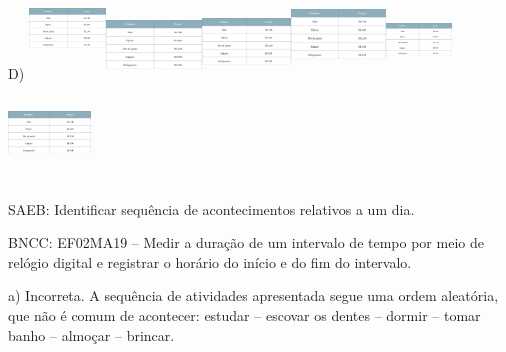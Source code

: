 \begin{escolha}
\begin{escolha}
{{{{D)
\includegraphics[width=0.80414in,height=1.05999in]{media/image148.png}\includegraphics[width=1.00005in,height=0.71336in]{media/image148.png}\includegraphics[width=0.92914in,height=0.77678in]{media/image148.png}\includegraphics[width=0.99167in,height=0.93413in]{media/image148.png}\includegraphics[width=0.68193in,height=0.81736in]{media/image148.png}\includegraphics[width=0.86664in,height=1.01803in]{media/image148.png}

SAEB: Identificar sequência de acontecimentos relativos a um
dia.

BNCC: EF02MA19 -- Medir a duração de um intervalo de tempo por meio de
relógio digital e registrar o horário do início e do fim do intervalo.

a) Incorreta. A sequência de atividades apresentada segue uma ordem
aleatória, que não é comum de acontecer: estudar -- escovar os dentes --
dormir -- tomar banho -- almoçar -- brincar.

}}}}
\end{escolha}
\end{escolha}
